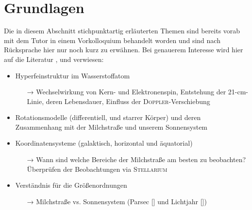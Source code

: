 \section{Grundlagen}
Die in diesem Abschnitt stichpunktartig erläuterten Themen sind bereits vorab mit dem Tutor in einem Vorkolloquium behandelt worden und sind nach Rücksprache hier nur noch kurz zu erwähnen. Bei genauerem Interesse wird hier auf die Literatur \cite{H1}, \cite{Usermanual} und \cite{AntennaResp} verwiesen:
\begin{itemize}
    \item Hyperfeinstruktur im Wasserstoffatom
    \begin{itemize}
        \item[→] Wechselwirkung von Kern- und Elektronenspin, Entstehung der 21-\si{\centi \metre}-Linie, deren Lebensdauer, Einfluss der \textsc{Doppler}-Verschiebung
    \end{itemize}
    \item Rotationsmodelle (differentiell,  und starrer Körper) und deren Zusammenhang mit der Milchstraße und unserem Sonnensystem
    \item Koordinatensysteme (galaktisch, horizontal und äquatorial)
    \begin{itemize}
        \item[→] Wann sind welche Bereiche der Milchstraße am besten zu beobachten? Überprüfen der Beobachtungen via \textsc{Stellarium} 
    \end{itemize}
    \item Verständnis für die Größenordnungen
    \begin{itemize}
        \item[→] Milchstraße vs. Sonnensystem (Parsec [\si{\parsec}] und Lichtjahr [\si{\lightyear}])
    \end{itemize}
\end{itemize}